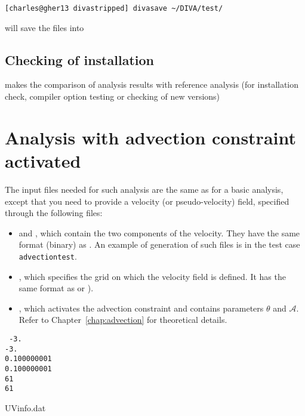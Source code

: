 \example
\begin{lstlisting}[style=Bash]
[charles@gher13 divastripped] divasave ~/DIVA/test/
\end{lstlisting}
will save the files into 

\subsection{Checking of installation}

 makes the comparison of analysis results with reference analysis (for
installation check, compiler option testing or checking of new versions)



\section{Analysis with advection constraint activated\label{sec:advection}}

The input files needed for such analysis are the same as for a basic analysis, except that you need to provide a velocity (or pseudo-velocity) field, specified through the following files:
\begin{itemize}
\item {} and , which contain the two components of the velocity. They have the same format (binary) as . An example of generation of such files is in the test case {\tt advectiontest}.
\item {}, which specifies the grid on which the velocity field is defined. It has the same format as  or ).
\item {}, which activates the advection constraint and contains parameters $\theta$ and $\mathcal{A}$. Refer to Chapter~\ref{chap:advection} for theoretical details.
\end{itemize}

\begin{exfile}[htpb]
\begin{footnotesize}
\texttt{
-3.\\
-3.\\
0.100000001\\
0.100000001\\
61\\
61
} 
\end{footnotesize}
\caption{UVinfo.dat\label{ex:UVinfo.dat}}
\end{exfile}


